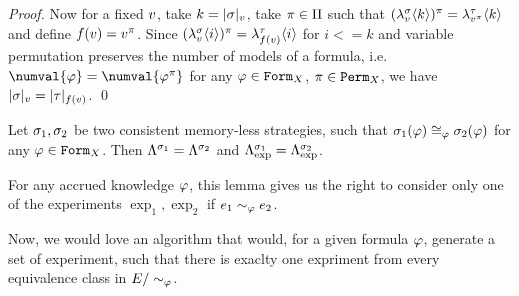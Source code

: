 \begin{proof}
Now for a fixed $v$, take $k = |\sigma|_{v}$, take
  $\pi\in\Pi$ such that
  $(\lambda^{\sigma}_{v}\langle k\rangle)^\pi = \lambda^{\tau}_{v^\pi}\langle k\rangle$
  and define $f(v) = v^\pi$.
Since
 $(\lambda^{\sigma}_{v}\langle i\rangle)^\pi = \lambda^{\tau}_{f(v)}\langle i\rangle$
 for $i <= k$
 and variable permutation preserves the number of models of a formula, i.e.
  $\numval{\form} = \numval{\form^\perm}$ for any
  $\varphi\in\mathtt{Form}_X$, $\pi\in\mathtt{Perm}_X$,
 we have
  $|\sigma|_{v} = |\tau|_{f(v)}$.
  \qed
\end{proof}

\begin{corollary}
Let $\sigma_1, \sigma_2$ be two consistent memory-less strategies, such that
  $\sigma_1(\varphi) \cong_{\varphi} \sigma_2(\varphi)$ for any $\varphi\in\mathtt{Form}_X$.
Then $\Lambda^{\sigma_1} = \Lambda^{\sigma_2}$
  and $\Lambda^{\sigma_1}_\textrm{exp} = \Lambda^{\sigma_2}_\textrm{exp}$.
\end{corollary}

For any accrued knowledge $\varphi$, this lemma gives us the right
to consider only one of the experiments
$\exp_1, \exp_2$ if $e_1 \sim_\varphi e_2$.

Now, we would love an algorithm that would, for a given formula $\varphi$,
generate a set of experiment, such that there is exaclty one expriment
from every equivalence class in $E/\sim_\varphi$.




